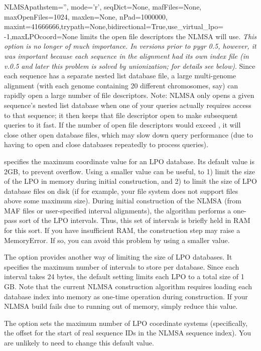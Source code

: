 \documentclass{howto}
\begin{document}
\begin{funcdesc}{NLMSA}{pathstem='', mode='r', seqDict=None, mafFiles=None, maxOpenFiles=1024, maxlen=None, nPad=1000000, maxint=41666666,trypath=None,bidirectional=True,use_virtual_lpo= -1,maxLPOcoord=None}
   limits the open file descriptors the NLMSA will use.
  {\em This option is no longer of much importance.  In versions prior to pygr 0.5,
  however, it was important because each sequence in the alignment had its
  own index file (in v.0.5 and later this problem is solved by unionization;
  for details see below)}.  Since
  each sequence has a separate nested list database file, a large multi-genome alignment
  (with each genome containing 20 different chromosomes, say) can rapidly open a large
  number of file descriptors.  Note: NLMSA only opens a given sequence's nested list database
  when one of your queries actually requires access to that sequence; it then
  keeps that file descriptor open to make subsequent queries to it fast.  If the number
  of open file descriptors would exceed , it will close other open
  database files, which may slow down query performance (due to having to open and close
  databases repeatedly to process queries).

   specifies the maximum coordinate
  value for an LPO database.  Its default value is 2GB, to prevent  overflow.
  Using a smaller value can be useful, to 1) limit the size of the LPO in memory
  during initial construction, and 2) to limit the size of LPO database files on disk
  (if for example, your file system does not support files above some maximum size).
  During initial construction of the NLMSA (from MAF files or user-specified interval
  alignments), the algorithm performs a one-pass sort of the LPO intervals.  Thus,
  this set of intervals is briefly held in RAM for this sort.  If you have insufficient
  RAM, the construction step may raise a MemoryError.  If so, you can avoid this problem
  by using a smaller  value.

  The  option provides another way of limiting the size of LPO
  databases.  It specifies the maximum number of intervals to store per database.
  Since each interval takes 24 bytes, the default setting limits each LPO to
  a total size of 1 GB.  Note that the current NLMSA construction algorithm
  requires loading each database index into memory as one-time operation
  during construction.  If your NLMSA build fails due to running out of memory,
  simply reduce this value.

  The  option sets the maximum number of LPO coordinate systems
  (specifically, the offset for the start of real sequence IDs in the NLMSA
  sequence index).  You are unlikely to need to change this default value.
\end{funcdesc}
\end{document}
